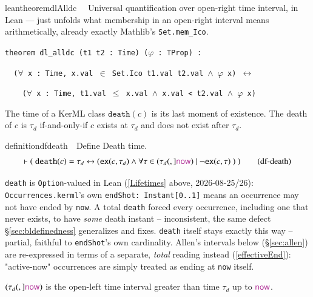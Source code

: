 \begin{restatable}{leantheorem}{dlAlldc}~~ Universal quantification over open-right time
interval, in Lean --- just unfolds what membership in an open-right interval means arithmetically, already
exactly Mathlib's \texttt{Set.mem\_Ico}.

\texttt{\textcolor{leancolor}{theorem} \textcolor{leanyellow}{dl\_alldc} (t1 t2 : Time) ($\varphi$ : TProp) :}

\texttt{~~($\forall$ x : Time, x.val $\in$ Set.Ico t1.val t2.val $\wedge$ $\varphi$ x) $\leftrightarrow$}

\texttt{~~~~($\forall$ x : Time, t1.val $\le$ x.val $\wedge$ x.val < t2.val $\wedge$ $\varphi$ x)}
\label{dl_alldc}
\end{restatable}

\pn The  time of a KerML class $\texttt{death}(c)$ is its last moment of existence.  The death of $c$ is $\tau_d$ if-and-only-if $c$ exists at
$\tau_d$ and does not exist after $\tau_d$.

\begin{restatable}{definition}{dfdeath}~~Define Death time.
\begin{align}
\vdash (~\texttt{death}(c)=\tau_d \leftrightarrow ( \texttt{ex}(c,\tau_d) \wedge \forall \tau \in (\tau_d(,]\mathsf{\mc{now}})~\vert~ \lnot \texttt{ex}(c,\tau)~)~)
\label{eq:df-death}\tag{df-death}
\end{align}
\end{restatable}

\pn \texttt{death} is \texttt{Option}-valued in Lean (\ref{Lifetimes} above, 2026-08-25/26):
\texttt{Occurrences.kerml}'s own \texttt{endShot: Instant[0..1]} means an occurrence may not have ended by
\texttt{now}. A total \texttt{death} forced every occurrence, including one that never exists, to have
\emph{some} death instant -- inconsistent, the same defect \S\ref{sec:bldefinedness} generalizes and fixes.
\texttt{death} itself stays exactly this way -- partial, faithful to \texttt{endShot}'s own cardinality. Allen's
intervals below (\S\ref{sec:allen}) are re-expressed in terms of a separate, \emph{total} reading instead
(\ref{effectiveEnd}): "active-now" occurrences are simply treated as ending at \texttt{now} itself.

\pn $(\tau_d(,]\mathsf{\mc{now}})$ is the open-left time interval greater than time $\tau_d$ up to $\mathsf{\mc{now}}$.


